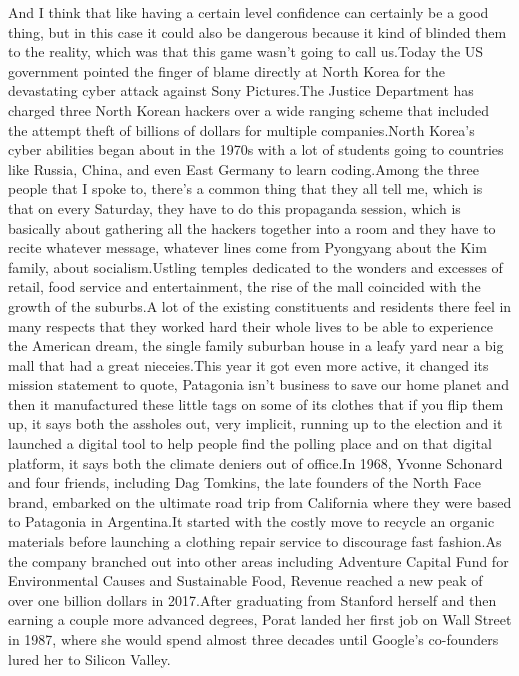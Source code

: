 \documentclass{article}%
\begin{document}
And I think that like having a certain level confidence can certainly be a good thing, but in this case it could also be dangerous because it kind of blinded them to the reality, which was that this game wasn't going to call us.Today the US government pointed the finger of blame directly at North Korea for the devastating cyber attack against Sony Pictures.The Justice Department has charged three North Korean hackers over a wide ranging scheme that included the attempt theft of billions of dollars for multiple companies.North Korea's cyber abilities began about in the 1970s with a lot of students going to countries like Russia, China, and even East Germany to learn coding.Among the three people that I spoke to, there's a common thing that they all tell me, which is that on every Saturday, they have to do this propaganda session, which is basically about gathering all the hackers together into a room and they have to recite whatever message, whatever lines come from Pyongyang about the Kim family, about socialism.Ustling temples dedicated to the wonders and excesses of retail, food service and entertainment, the rise of the mall coincided with the growth of the suburbs.A lot of the existing constituents and residents there feel in many respects that they worked hard their whole lives to be able to experience the American dream, the single family suburban house in a leafy yard near a big mall that had a great nieceies.This year it got even more active, it changed its mission statement to quote, Patagonia isn't business to save our home planet and then it manufactured these little tags on some of its clothes that if you flip them up, it says both the assholes out, very implicit, running up to the election and it launched a digital tool to help people find the polling place and on that digital platform, it says both the climate deniers out of office.In 1968, Yvonne Schonard and four friends, including Dag Tomkins, the late founders of the North Face brand, embarked on the ultimate road trip from California where they were based to Patagonia in Argentina.It started with the costly move to recycle an organic materials before launching a clothing repair service to discourage fast fashion.As the company branched out into other areas including Adventure Capital Fund for Environmental Causes and Sustainable Food, Revenue reached a new peak of over one billion dollars in 2017.After graduating from Stanford herself and then earning a couple more advanced degrees, Porat landed her first job on Wall Street in 1987, where she would spend almost three decades until Google's co{-}founders lured her to Silicon Valley.%
\end{document}
